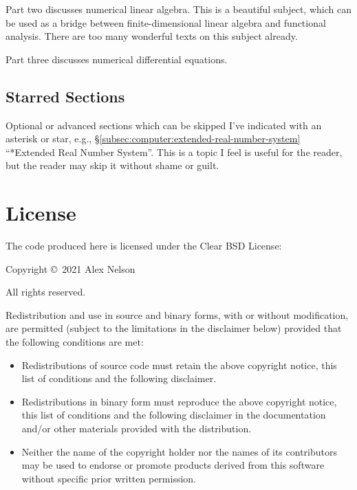 \bigbreak
Part two discusses numerical linear algebra. This is a beautiful
subject, which can be used as a bridge between finite-dimensional linear
algebra and functional analysis. There are too many wonderful texts on
this subject already.

\bigbreak
Part three discusses numerical differential equations.

\subsection*{Starred Sections}

Optional or advanced sections which can be skipped I've indicated with
an asterisk or star, e.g.,
\S\ref{subsec:computer:extended-real-number-system} ``*Extended Real
Number System''. This is a topic I feel is useful for the reader, but
the reader may skip it without shame or guilt.

\section*{License}

The code produced here is licensed under the Clear BSD License:

\bigskip

Copyright \copyright\ 2021 Alex Nelson

All rights reserved.

Redistribution and use in source and binary forms, with or without
modification, are permitted (subject to the limitations in the
disclaimer below) provided that the following conditions are met:

\begin{itemize}
\item Redistributions of source code must retain the above copyright
     notice, this list of conditions and the following disclaimer.
\item Redistributions in binary form must reproduce the above copyright
     notice, this list of conditions and the following disclaimer in the
     documentation and/or other materials provided with the
     distribution.
\item Neither the name of the copyright holder nor the names of its
     contributors may be used to endorse or promote products derived
     from this software without specific prior written permission.
\end{itemize}

